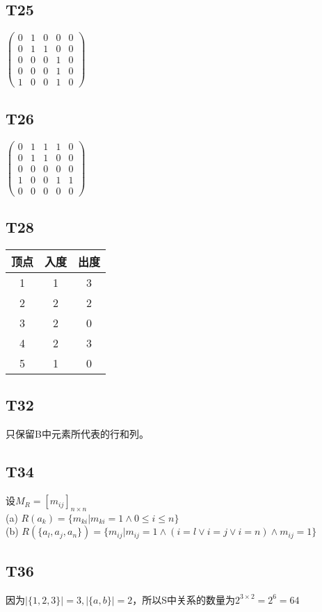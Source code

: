 \documentclass{article}
\begin{document}
\subsection{T25}
$
\begin{pmatrix}
    0 & 1 & 0 & 0 & 0\\
    0 & 1 & 1 & 0 & 0\\
    0 & 0 & 0 & 1 & 0\\
    0 & 0 & 0 & 1 & 0\\
    1 & 0 & 0 & 1 & 0
\end{pmatrix}
$
\subsection{T26}
$
\begin{pmatrix}
    0 & 1 & 1 & 1 & 0\\
    0 & 1 & 1 & 0 & 0\\
    0 & 0 & 0 & 0 & 0\\
    1 & 0 & 0 & 1 & 1\\
    0 & 0 & 0 & 0 & 0
\end{pmatrix}
$
\subsection{T28}
\begin{tabular}{c|c|c}
    顶点 & 入度 & 出度\\
    \hline
    1 & 1 & 3\\
    2 & 2 & 2\\
    3 & 2 & 0\\
    4 & 2 & 3\\
    5 & 1 & 0
\end{tabular}
\subsection{T32}
只保留B中元素所代表的行和列。
\subsection{T34}
设$M_R = [m_{ij}]_{n \times n}$\\
(a) $R(a_k) = \{m_{ki} | m_{ki} = 1 \land 0 \leq i \leq n\}$\\
(b) $R(\{a_l, a_j, a_n\}) = \{m_{ij} | m_{ij} = 1 \land (i = l \lor i = j \lor i = n) \land m_{ij} = 1\}$
\subsection{T36}
因为$|\{1, 2, 3\}| = 3, |\{a, b\}| = 2$，所以S中关系的数量为$2^{3 \times 2} = 2^6 = 64$ 
\end{document}
